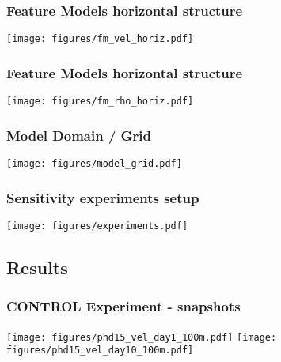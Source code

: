 \documentclass{beamer}
\begin{document}
\frame
{
  \frametitle{Feature Models horizontal structure}
\begin{center}
\texttt{[image: figures/fm\_vel\_horiz.pdf]}
\end{center}
}

\frame
{
  \frametitle{Feature Models horizontal structure}
\begin{center}
\texttt{[image: figures/fm\_rho\_horiz.pdf]}
\end{center}
}



\frame
{
  \frametitle{Model Domain / Grid}
\begin{center}
\texttt{[image: figures/model\_grid.pdf]}
\end{center}
}

\frame
{
  \frametitle{Sensitivity experiments setup}
\begin{center}
\texttt{[image: figures/experiments.pdf]}
\end{center}
}



\subsection{Results}

\frame
{
  \frametitle{CONTROL Experiment - snapshots}
\begin{center}
\texttt{[image: figures/phd15\_vel\_day1\_100m.pdf]}
\texttt{[image: figures/phd15\_vel\_day10\_100m.pdf]}
\end{center}
}
\end{document}
